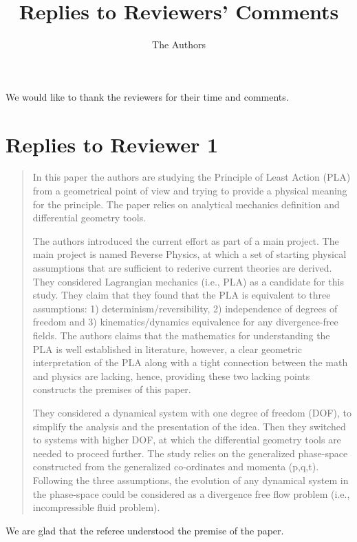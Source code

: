 \documentclass[11pt, executivepaper]{article}
\begin{document}
\title{\textbf{Replies to Reviewers' Comments}}

\author{The Authors}

\maketitle


\noindent We would like to thank the reviewers for their time and comments.

\section{Replies to Reviewer 1}

\begin{quote}
 In this paper the authors are studying the Principle of Least Action (PLA) from a geometrical point of view and trying to provide a physical meaning for the principle. The paper relies on analytical mechanics definition and differential geometry tools.

The authors introduced the current effort as part of a main project. The main project is named Reverse Physics, at which a set of starting physical assumptions that are sufficient to rederive current theories are derived. They considered Lagrangian mechanics (i.e., PLA) as a candidate for this study. They claim that they found that the PLA is equivalent to three assumptions: 1) determinism/reversibility, 2) independence of degrees of freedom and 3) kinematics/dynamics equivalence for any divergence-free fields. The authors claims that the mathematics for understanding the PLA is well established in literature, however, a clear geometric interpretation of the PLA along with a tight connection between the math and physics are lacking, hence, providing these two lacking points constructs the premises of this paper. 

They considered a dynamical system with one degree of freedom (DOF), to simplify the analysis and the presentation of the idea. Then they switched to systems with higher DOF, at which the differential geometry tools are needed to proceed further. The study relies on the generalized phase-space constructed from the generalized co-ordinates and momenta (p,q,t). Following the three assumptions, the evolution of any dynamical system in the phase-space could be considered as a divergence free flow problem (i.e., incompressible fluid problem).
\end{quote}
We are glad that the referee understood the premise of the paper.
\end{document}
